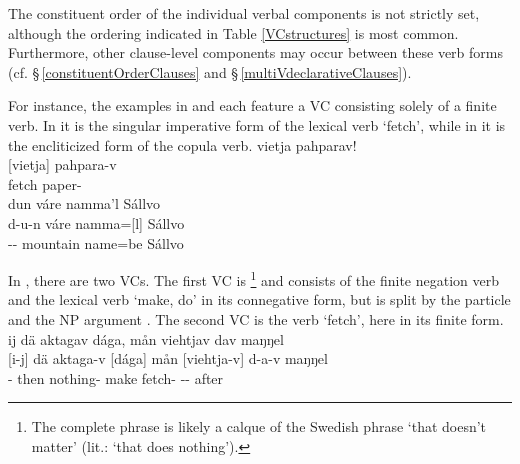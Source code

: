 \FB
The constituent order of the individual verbal components is not strictly set, although the ordering indicated in Table \vref{VCstructures} is most common. Furthermore, other clause-level components may occur between these verb forms (cf. §\,\ref{constituentOrderClauses} and §\,\ref{multiVdeclarativeClauses}). 

For instance, the examples in  and  each feature a VC consisting solely of a finite verb. In  it is the singular imperative form of the lexical verb  ‘fetch’, while in  it is the encliticized  form of the copula verb. %
\ea\label{VCex1}
\glll	vietja pahparav!\\
	{[vietja]\subVC} pahpara-v\\
	fetch\BS{} paper-\\\nopagebreak
{}	
\z
\ea\label{VCex2}
\glll	dun váre namma'l Sállvo\\
	d-u-n váre {namma=[l]\subVC} Sállvo\\
	-- mountain\BS{} name\BS{}=be\BS{} Sállvo\BS{}\\\nopagebreak
{}	
\z

In , there are two VCs. The first VC is %
\footnote{The complete phrase  is likely a calque of the Swedish phrase  ‘that doesn’t matter’ (lit.: ‘that does nothing’).} %
and consists of the finite negation verb and the lexical verb  ‘make, do’ in its connegative form, but is split by the particle  and the NP argument . The second VC is the verb  ‘fetch’, here in its  finite form. 
\ea\label{VCex3}
\glll	ij dä aktagav dága, mån viehtjav dav maŋŋel\\
	{[i-j]\subVC{}} dä aktaga-v {[dága]\subVC{}} mån {[viehtja-v]\subVC{}} d-a-v maŋŋel\\
	- then nothing- make\BS{}  fetch- -- after\\\nopagebreak
{}	
\z

